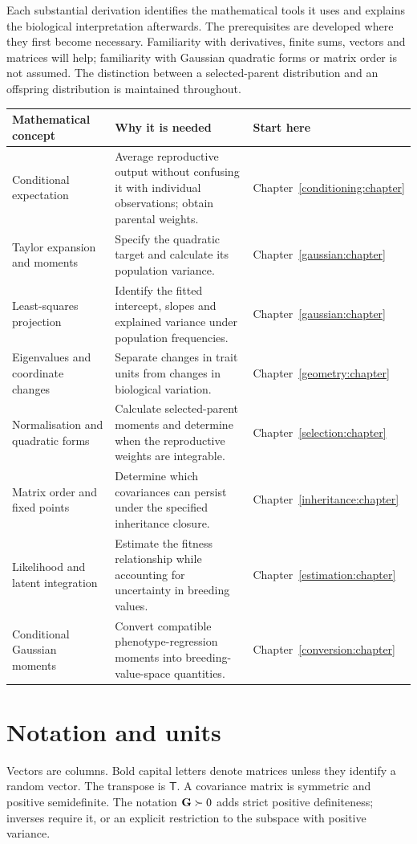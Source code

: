 Each substantial derivation identifies the mathematical tools it uses and explains the biological interpretation afterwards. The prerequisites are developed where they first become necessary. Familiarity with derivatives, finite sums, vectors and matrices will help; familiarity with Gaussian quadratic forms or matrix order is not assumed. The distinction between a selected-parent distribution and an offspring distribution is maintained throughout.

\begin{longtable}{@{}>{\raggedright\arraybackslash}p{}>{\raggedright\arraybackslash}p{}>{\raggedright\arraybackslash}p{}@{}}
\toprule
Mathematical concept & Why it is needed & Start here \\
\midrule\endhead
Conditional expectation & Average reproductive output without confusing it with individual observations; obtain parental weights. & Chapter~\ref{conditioning:chapter} \\
Taylor expansion and moments & Specify the quadratic target and calculate its population variance. & Chapter~\ref{gaussian:chapter} \\
Least-squares projection & Identify the fitted intercept, slopes and explained variance under population frequencies. & Chapter~\ref{gaussian:chapter} \\
Eigenvalues and coordinate changes & Separate changes in trait units from changes in biological variation. & Chapter~\ref{geometry:chapter} \\
Normalisation and quadratic forms & Calculate selected-parent moments and determine when the reproductive weights are integrable. & Chapter~\ref{selection:chapter} \\
Matrix order and fixed points & Determine which covariances can persist under the specified inheritance closure. & Chapter~\ref{inheritance:chapter} \\
Likelihood and latent integration & Estimate the fitness relationship while accounting for uncertainty in breeding values. & Chapter~\ref{estimation:chapter} \\
Conditional Gaussian moments & Convert compatible phenotype-regression moments into breeding-value-space quantities. & Chapter~\ref{conversion:chapter} \\
\bottomrule
\end{longtable}

\section*{Notation and units}
Vectors are columns. Bold capital letters denote matrices unless they identify a random vector. The transpose is $\mathsf T$. A covariance matrix is symmetric and positive semidefinite. The notation $\mathbf{G}\succ0$ adds strict positive definiteness; inverses require it, or an explicit restriction to the subspace with positive variance.

